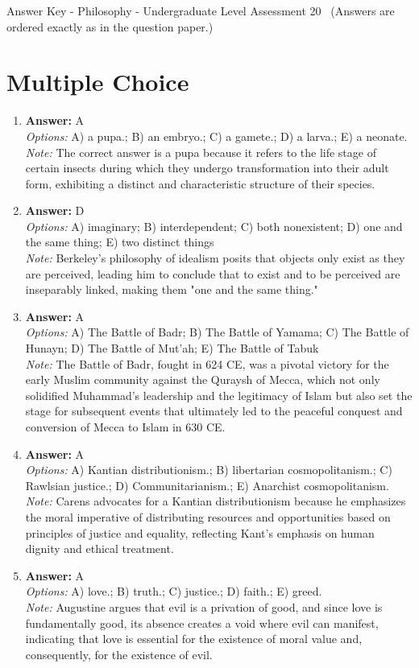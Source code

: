\documentclass[12pt]{article}
\begin{document}
\begin{center}
Answer Key - Philosophy - Undergraduate Level Assessment 20 \
\small (Answers are ordered exactly as in the question paper.)
\end{center}

\section*{Multiple Choice}
\begin{enumerate}[label=\arabic*.]
\item \textbf{Answer:} A
\\ \textit{Options:} A) a pupa.; B) an embryo.; C) a gamete.; D) a larva.; E) a neonate.
\\ \textit{Note:} The correct answer is a pupa because it refers to the life stage of certain insects during which they undergo transformation into their adult form, exhibiting a distinct and characteristic structure of their species.
\item \textbf{Answer:} D
\\ \textit{Options:} A) imaginary; B) interdependent; C) both nonexistent; D) one and the same thing; E) two distinct things
\\ \textit{Note:} Berkeley's philosophy of idealism posits that objects only exist as they are perceived, leading him to conclude that to exist and to be perceived are inseparably linked, making them "one and the same thing."
\item \textbf{Answer:} A
\\ \textit{Options:} A) The Battle of Badr; B) The Battle of Yamama; C) The Battle of Hunayn; D) The Battle of Mut'ah; E) The Battle of Tabuk
\\ \textit{Note:} The Battle of Badr, fought in 624 CE, was a pivotal victory for the early Muslim community against the Quraysh of Mecca, which not only solidified Muhammad's leadership and the legitimacy of Islam but also set the stage for subsequent events that ultimately led to the peaceful conquest and conversion of Mecca to Islam in 630 CE.
\item \textbf{Answer:} A
\\ \textit{Options:} A) Kantian distributionism.; B) libertarian cosmopolitanism.; C) Rawlsian justice.; D) Communitarianism.; E) Anarchist cosmopolitanism.
\\ \textit{Note:} Carens advocates for a Kantian distributionism because he emphasizes the moral imperative of distributing resources and opportunities based on principles of justice and equality, reflecting Kant's emphasis on human dignity and ethical treatment.
\item \textbf{Answer:} A
\\ \textit{Options:} A) love.; B) truth.; C) justice.; D) faith.; E) greed.
\\ \textit{Note:} Augustine argues that evil is a privation of good, and since love is fundamentally good, its absence creates a void where evil can manifest, indicating that love is essential for the existence of moral value and, consequently, for the existence of evil.
\end{enumerate}
\end{document}

